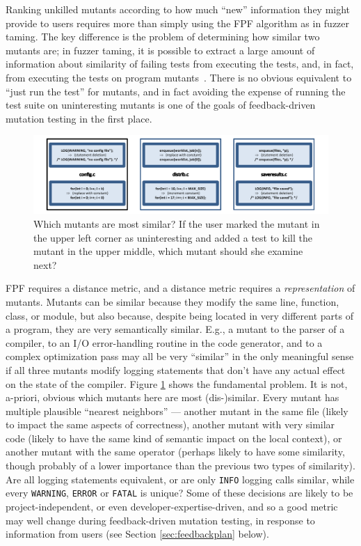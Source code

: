 Ranking unkilled mutants according to how much ``new'' information they might
provide to users requires more than simply using the FPF algorithm as
in fuzzer taming.  The key difference is the problem of determining
how similar two mutants are; in fuzzer taming, it is possible to
extract a large amount of information about similarity of failing
tests from executing the tests, and, in fact, from executing the tests
on program mutants~\cite{PLDI13,distMut}.  There is no obvious
equivalent to
``just run the test'' for mutants, and in fact avoiding the expense of running
the test suite on uninteresting mutants is one of the goals of
feedback-driven mutation testing in the first place.

\begin{figure}[t]
\centering
\includegraphics[width=0.95\columnwidth]{distmetric}

\caption{Which mutants are most similar?  If the user marked the
  mutant in the upper left corner as uninteresting and added a test
  to kill the
  mutant in the upper middle, which mutant
  should she examine next?}
\label{fig:distances}
\end{figure}


FPF requires a distance metric, and a distance metric requires a
\emph{representation} of mutants.  Mutants can be similar because they
modify the same line, function, class, or module, but also because,
despite being located in very different parts of a program, they are
very semantically similar.  E.g., a mutant to the parser of a compiler, to
an I/O error-handling routine in the code generator, and to a complex
optimization pass may all be very ``similar'' in the only meaningful
sense if all three mutants modify logging statements that don't have
any actual effect on the state of the compiler.  Figure
\ref{fig:distances} shows the fundamental problem.  It is not,
a-priori, obvious which mutants here are most (dis-)similar.  Every
mutant has multiple plausible ``nearest neighbors'' --- another mutant
in the same file (likely to impact the same aspects of correctness),
another mutant with very similar code (likely to have the same kind of
semantic impact on the local context), or another mutant with the same operator (perhaps
likely to have some similarity, though probably of a lower importance
than the previous two types of similarity).  Are all logging statements
equivalent, or are only {\tt INFO} logging calls similar, while every
{\tt WARNING}, {\tt ERROR} or {\tt FATAL} is unique?  Some of these
decisions are likely to be project-independent, or even
developer-expertise-driven, and so a good metric
may well change during feedback-driven mutation testing, in response
to information from users (see Section \ref{sec:feedbackplan} below).

